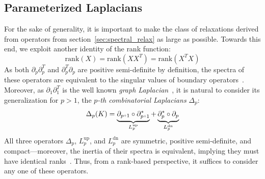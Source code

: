 \documentclass[10pt]{article}
\numberwithin{equation}{section}
\newcommand{\+}{%
	\raisebox{0.18ex}{\scaleobj{0.55}{+}}
}
\theoremstyle{definition}
\theoremstyle{definition}
\newcommand{\cupdot}{\mathbin{\mathaccent\cdot\cup}}
\begin{document}
\subsection{Parameterized Laplacians}\label{sec:laplacian_theory2}
 For the sake of generality, it is important to make the class of relaxations derived from operators from section~\ref{sec:spectral_relax} as large as possible.
Towards this end, we exploit another identity of the rank function:
$$\mathrm{rank}(X) = \mathrm{rank}(X X^T) = \mathrm{rank}(X^T X)$$ 
As both $\partial_p \partial_p^T$ and $\partial_p^T \partial_p$ are positive semi-definite by definition, the spectra of these operators are equivalent to the singular values of boundary operators~\cite{horak2013spectra}.  
Moreover, as $\partial_1 \partial_1^T$ is the well known \emph{graph Laplacian}~\cite{chung1997spectral}, it is natural to consider its generalization for $p > 1$, the \emph{$p$-th combinatorial Laplacians} $\Delta_p$: 
\begin{equation}\label{eq:comb_lap}
	\Delta_p(K) = 
	\underbrace{\partial_{p\+1} \circ \partial_{p\+1}^\ast}_{L_p^{\text{up}}} + \underbrace{\partial_{p}^\ast  \circ  \partial_{p}}_{L_p^{\text{dn}}} 
\end{equation}
\noindent 
All three operators $\Delta_p$, $L_p^{\text{up}}$, and $L_p^{\text{dn}}$ are symmetric, positive semi-definite, and compact---moreover, the inertia of their spectra is equivalent, implying they must have identical ranks~\cite{horak2013spectra}. %
Thus, from a rank-based perspective, it suffices to consider any one of these operators.
\end{document}

